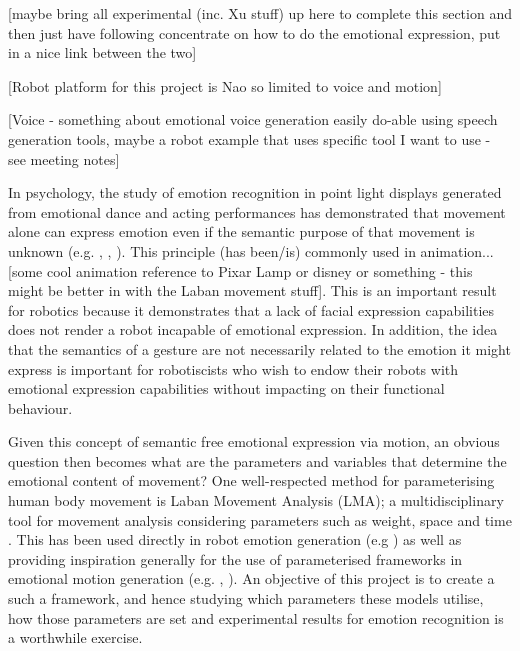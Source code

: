 \documentclass[11pt]{article}
\begin{document}
[maybe bring all experimental (inc. Xu stuff) up here to complete this section and then just have following concentrate on how to do the emotional expression, put in a nice link between the two]

[Robot platform for this project is Nao so limited to voice and motion]

[Voice - something about emotional voice generation easily do-able using speech generation tools, maybe a robot example that uses specific tool I want to use - see meeting notes]

In psychology, the study of emotion recognition in point light displays generated from emotional dance and acting performances has demonstrated that movement alone can express emotion even if the semantic purpose of that movement is unknown (e.g. \cite{dittrich1996perception}, \cite{pollick2001perceiving}, \cite{atkinson2004emotion}). This principle (has been/is) commonly used in animation...[some cool animation reference to Pixar Lamp or disney or something - this might be better in with the Laban movement stuff]. This is an important result for robotics because it demonstrates that a lack of facial expression capabilities does not render a robot incapable of emotional expression. In addition, the idea that the semantics of a gesture are not necessarily related to the emotion it might express is important for robotiscists who wish to endow their robots with emotional expression capabilities without impacting on their functional behaviour. 

Given this concept of semantic free emotional expression via motion, an obvious question then becomes what are the parameters and variables that determine the emotional content of movement? One well-respected method for parameterising human body movement is Laban Movement Analysis (LMA); a multidisciplinary tool for movement analysis considering parameters such as weight, space and time \cite{lab2011}. This has been used directly in robot emotion generation (e.g \cite{masuda2010motion}) as well as providing inspiration generally for the use of parameterised frameworks in emotional motion generation (e.g. \cite{lim2011converting}, \cite{xu2013mood}). An objective of this project is to create a such a framework, and hence studying which parameters these models utilise, how those parameters are set and experimental results for emotion recognition is a worthwhile exercise.
\end{document}
